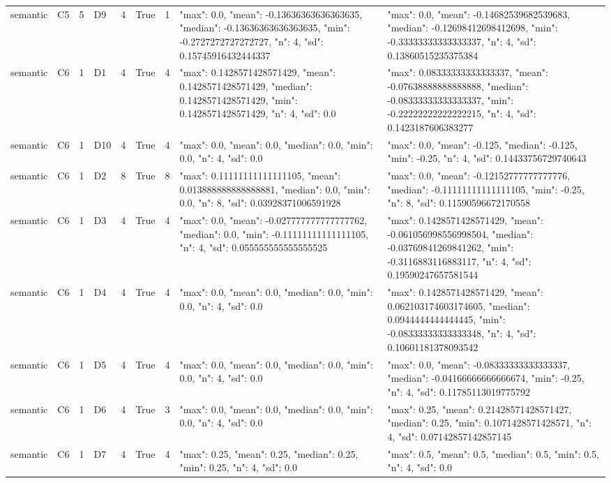 \begin{tabular}{lllllllll}
semantic & C5 & 5 & D9 & 4 & True & 1 & {"max": 0.0, "mean": -0.13636363636363635, "median": -0.13636363636363635, "min": -0.2727272727272727, "n": 4, "sd": 0.15745916432444337} & {"max": 0.0, "mean": -0.14682539682539683, "median": -0.12698412698412698, "min": -0.33333333333333337, "n": 4, "sd": 0.13860515235375384} \\
semantic & C6 & 1 & D1 & 4 & True & 4 & {"max": 0.1428571428571429, "mean": 0.1428571428571429, "median": 0.1428571428571429, "min": 0.1428571428571429, "n": 4, "sd": 0.0} & {"max": 0.08333333333333337, "mean": -0.07638888888888888, "median": -0.08333333333333337, "min": -0.22222222222222215, "n": 4, "sd": 0.1423187606383277} \\
semantic & C6 & 1 & D10 & 4 & True & 4 & {"max": 0.0, "mean": 0.0, "median": 0.0, "min": 0.0, "n": 4, "sd": 0.0} & {"max": 0.0, "mean": -0.125, "median": -0.125, "min": -0.25, "n": 4, "sd": 0.14433756729740643} \\
semantic & C6 & 1 & D2 & 8 & True & 8 & {"max": 0.11111111111111105, "mean": 0.013888888888888881, "median": 0.0, "min": 0.0, "n": 8, "sd": 0.03928371006591928} & {"max": 0.0, "mean": -0.12152777777777776, "median": -0.11111111111111105, "min": -0.25, "n": 8, "sd": 0.11590596672170558} \\
semantic & C6 & 1 & D3 & 4 & True & 4 & {"max": 0.0, "mean": -0.027777777777777762, "median": 0.0, "min": -0.11111111111111105, "n": 4, "sd": 0.055555555555555525} & {"max": 0.1428571428571429, "mean": -0.061056998556998504, "median": -0.03769841269841262, "min": -0.3116883116883117, "n": 4, "sd": 0.19590247657581544} \\
semantic & C6 & 1 & D4 & 4 & True & 4 & {"max": 0.0, "mean": 0.0, "median": 0.0, "min": 0.0, "n": 4, "sd": 0.0} & {"max": 0.1428571428571429, "mean": 0.062103174603174605, "median": 0.0944444444444445, "min": -0.08333333333333348, "n": 4, "sd": 0.10601181378093542} \\
semantic & C6 & 1 & D5 & 4 & True & 4 & {"max": 0.0, "mean": 0.0, "median": 0.0, "min": 0.0, "n": 4, "sd": 0.0} & {"max": 0.0, "mean": -0.08333333333333337, "median": -0.04166666666666674, "min": -0.25, "n": 4, "sd": 0.11785113019775792} \\
semantic & C6 & 1 & D6 & 4 & True & 3 & {"max": 0.0, "mean": 0.0, "median": 0.0, "min": 0.0, "n": 4, "sd": 0.0} & {"max": 0.25, "mean": 0.21428571428571427, "median": 0.25, "min": 0.1071428571428571, "n": 4, "sd": 0.07142857142857145} \\
semantic & C6 & 1 & D7 & 4 & True & 4 & {"max": 0.25, "mean": 0.25, "median": 0.25, "min": 0.25, "n": 4, "sd": 0.0} & {"max": 0.5, "mean": 0.5, "median": 0.5, "min": 0.5, "n": 4, "sd": 0.0} \\

\end{tabular}
